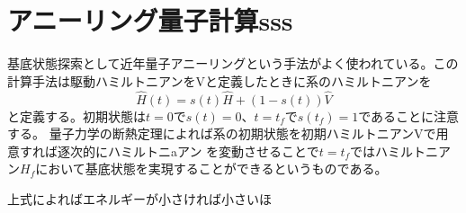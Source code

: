 \section{アニーリング量子計算sss}
基底状態探索として近年量子アニーリングという手法がよく使われている。この計算手法は駆動ハミルトニアンをVと定義したときに系のハミルトニアンを
\begin{equation}
    \hat{H}(t) = s(t) \hat{H} +(1-s(t))\hat{V}
\end{equation}
と定義する。初期状態は$t=0$で$s(t)=0$、$t=t_f$で$s(t_f)=1$であることに注意する。
量子力学の断熱定理によれば系の初期状態を初期ハミルトニアンVで用意すれば逐次的にハミルトニaアン
を変動させることで$t=t_f$ではハミルトニアン$H_f$において基底状態を実現することができるというものである。

上式によればエネルギーが小さければ小さいほ\cite*{Wulschner2016}